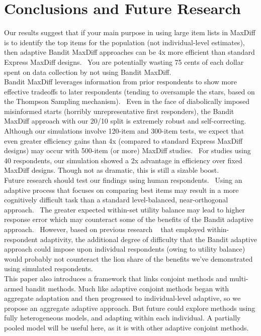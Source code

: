 \documentclass[nonblindrev]{informs3}
\begin{document}
\section{Conclusions and Future Research}
Our results suggest that if your main purpose in using large item lists in MaxDiff is to identify the top items for the population (not individual-level estimates), then adaptive Bandit MaxDiff approaches can be 4x more efficient than standard Express MaxDiff designs.  You are potentially wasting 75 cents of each dollar spent on data collection by not using Bandit MaxDiff.\\
Bandit MaxDiff leverages information from prior respondents to show more effective tradeoffs to later respondents (tending to oversample the stars, based on the Thompson Sampling mechanism).  Even in the face of diabolically imposed misinformed starts (horribly unrepresentative first responders), the Bandit MaxDiff approach with our 20/10 split is extremely robust and self-correcting.\\
Although our simulations involve 120-item and 300-item tests, we expect that even greater efficiency gains than 4x (compared to standard Express MaxDiff designs) may occur with 500-item (or more) MaxDiff studies.  For studies using 40 respondents, our simulation showed a 2x advantage in efficiency over fixed MaxDiff designs. Though not as dramatic, this is still a sizable boost.\\
Future research should test our findings using human respondents.  Using an adaptive process that focuses on comparing best items may result in a more cognitively difficult task than a standard level-balanced, near-orthogonal approach.  The greater expected within-set utility balance may lead to higher response error which may counteract some of the benefits of the Bandit adaptive approach.  However, based on previous research ~\cite{orme2006adaptive} that employed within-respondent adaptivity, the additional degree of difficulty that the Bandit adaptive approach could impose upon individual respondents (owing to utility balance) would probably not counteract the lion share of the benefits we've demonstrated using simulated respondents.\\

This paper also introduces a framework that links conjoint methods and multi-armed bandit methods. Much like adaptive conjoint methods began with aggregate adaptation and then progressed to individual-level adaptive, so we propose an aggregate adaptive approach. But future could explore methods using fully heterogeneous models, and adapting within each individual. A partially pooled model will be useful here, as it is with other adaptive conjoint methods. \\
\end{document}
